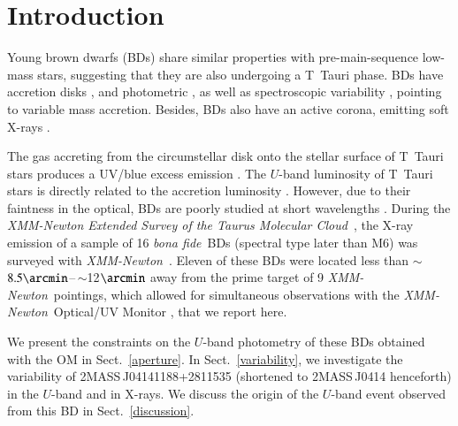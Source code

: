 \documentclass{aa}
\newcommand{\xmm}{{\it XMM-Newton}}
\newcommand{\bona}{{\sl bona fide}}
\newcommand{\xest}{{\it XMM-Newton Extended Survey of the Taurus
Molecular Cloud}}
\begin{document}
   \maketitle
%

\section{Introduction}

Young brown dwarfs (BDs) share similar properties with
pre-main-sequence low-mass stars, suggesting that they are also
undergoing a T~Tauri phase. BDs have accretion disks
\citep[e.g.,][]{jayawardhana03,natta04,mohanty05}, and photometric
\citep{scholz04a,scholz04b}, as well as spectroscopic variability
\citep{scholz05a,scholz06}, pointing to variable mass
accretion. Besides, BDs also have an active corona, emitting soft X-rays
\citep[e.g.,][]{neuhaeuser99,preibisch05}. 

The gas accreting from the circumstellar disk onto the stellar surface
of T~Tauri stars produces a UV/blue excess emission \citep[see review
by][]{bouvier06}. The $U$-band luminosity of T~Tauri stars is directly
related to the accretion luminosity \citep{gullbring98}. However, due
to their faintness in the optical, BDs are poorly studied at short
wavelengths \citep[][]{gizis05}.
During the \xest~\citep[XEST;][]{guedel06b},
the X-ray emission of a sample of 16 \bona~BDs 
(spectral type later than M6) was
surveyed with \xmm~\citep{grosso06}. Eleven of these BDs were
located less than $\sim$$8.5\arcmin$--\,$\sim$12$\arcmin$ away from the
prime target of 9 \xmm~pointings, which allowed for simultaneous observations with the
\xmm~Optical/UV Monitor \citep[OM;][]{mason01}, that we report here.

We present the constraints on the $U$-band photometry of these BDs
obtained with the OM in Sect.~\ref{aperture}. In
Sect.~\ref{variability}, we investigate the variability of
2MASS\,J04141188+2811535 (shortened to 2MASS\,J0414 henceforth) in the
$U$-band and in X-rays. We discuss the origin of the $U$-band event
observed from this BD in Sect.~\ref{discussion}.
\end{document}
